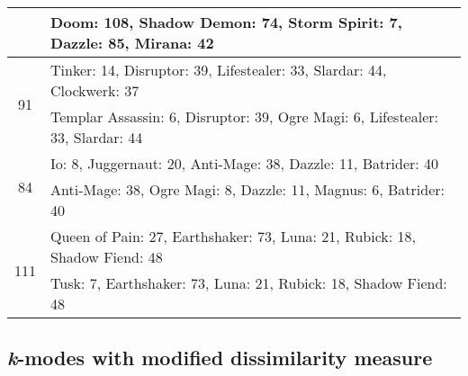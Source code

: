 \documentclass[result.tex]{subfiles}
\begin{document}
\begin{table}[H]
\begin{tabular}{ | c | p{12.5cm} | }
& Doom: 108, Shadow Demon: 74, Storm Spirit: 7, Dazzle: 85, Mirana: 42 \\
\hline
\multirow{2}{*}{91}
& Tinker: 14, Disruptor: 39, Lifestealer: 33, Slardar: 44, Clockwerk: 37 \\
& Templar Assassin: 6, Disruptor: 39, Ogre Magi: 6, Lifestealer: 33, Slardar: 44 \\
\hline
\multirow{2}{*}{84}
& Io: 8, Juggernaut: 20, Anti-Mage: 38, Dazzle: 11, Batrider: 40 \\
& Anti-Mage: 38, Ogre Magi: 8, Dazzle: 11, Magnus: 6, Batrider: 40 \\
\hline
\multirow{2}{*}{111}
& Queen of Pain: 27, Earthshaker: 73, Luna: 21, Rubick: 18, Shadow Fiend: 48 \\
& Tusk: 7, Earthshaker: 73, Luna: 21, Rubick: 18, Shadow Fiend: 48 \\
\hline
    \end{tabular}
    \caption{}
    \label{}
    \end{table}


\subsection*{\textit{k}-modes with modified dissimilarity measure}
\end{document}
